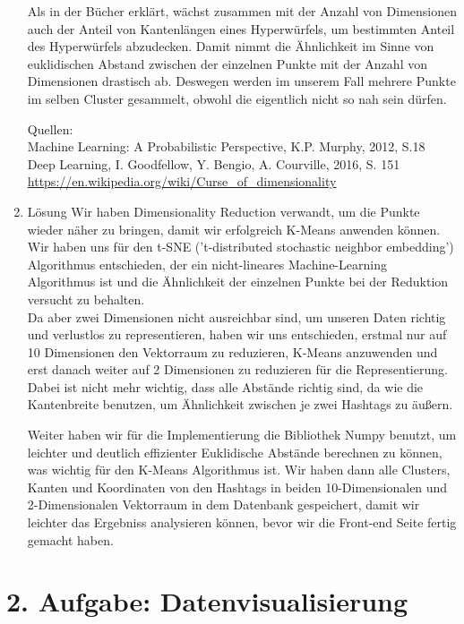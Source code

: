 \begin{enumerate}
Als in der Bücher erklärt, wächst zusammen mit der Anzahl von Dimensionen auch der Anteil von Kantenlängen eines Hyperwürfels, um bestimmten Anteil des Hyperwürfels abzudecken. Damit nimmt die Ähnlichkeit im Sinne von euklidischen Abstand zwischen der einzelnen Punkte mit der Anzahl von Dimensionen drastisch ab. Deswegen werden im unserem Fall mehrere Punkte im selben Cluster gesammelt, obwohl die eigentlich nicht so nah sein dürfen.

Quellen: \\
Machine Learning: A Probabilistic Perspective, K.P. Murphy, 2012, S.18 \\
Deep Learning, I. Goodfellow, Y. Bengio, A. Courville, 2016, S. 151 \\
\url{https://en.wikipedia.org/wiki/Curse_of_dimensionality}

\item Lösung 
Wir haben Dimensionality Reduction verwandt, um die Punkte wieder näher zu bringen, damit wir erfolgreich K-Means anwenden können. Wir haben uns für den t-SNE ('t-distributed stochastic neighbor embedding') Algorithmus entschieden, der ein nicht-lineares Machine-Learning Algorithmus ist und die Ähnlichkeit der einzelnen Punkte bei der Reduktion versucht zu behalten. \\

Da aber zwei Dimensionen nicht ausreichbar sind, um unseren Daten richtig und verlustlos zu representieren, haben wir uns entschieden, erstmal nur auf 10 Dimensionen den Vektorraum zu reduzieren, K-Means anzuwenden und erst danach weiter auf 2 Dimensionen zu reduzieren für die Representierung. Dabei ist nicht mehr wichtig, dass alle Abstände richtig sind, da wie die Kantenbreite benutzen, um Ähnlichkeit zwischen je zwei Hashtags zu äußern.

Weiter haben wir für die Implementierung die Bibliothek Numpy benutzt, um leichter und deutlich effizienter Euklidische Abstände berechnen zu können, was wichtig für den K-Means Algorithmus ist. Wir haben dann alle Clusters, Kanten und Koordinaten von den Hashtags in beiden 10-Dimensionalen und 2-Dimensionalen Vektorraum in dem Datenbank gespeichert, damit wir leichter das Ergebniss analysieren können, bevor wir die Front-end Seite fertig gemacht haben.  



\end{enumerate}

\section*{2. Aufgabe: Datenvisualisierung}

